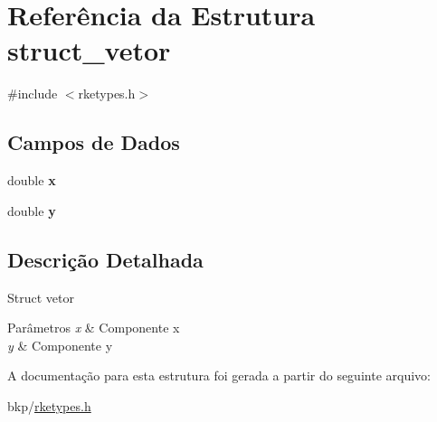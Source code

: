 \hypertarget{structstruct__vetor}{
\section{Referência da Estrutura struct\_\-vetor}
\label{structstruct__vetor}
}


{\ttfamily \#include $<$rketypes.h$>$}

\subsection*{Campos de Dados}
\begin{DoxyCompactItemize}
\item 
\hypertarget{structstruct__vetor_af88b946fb90d5f08b5fb740c70e98c10}{
double {\bfseries x}}
\label{structstruct__vetor_af88b946fb90d5f08b5fb740c70e98c10}

\item 
\hypertarget{structstruct__vetor_ab927965981178aa1fba979a37168db2a}{
double {\bfseries y}}
\label{structstruct__vetor_ab927965981178aa1fba979a37168db2a}

\end{DoxyCompactItemize}


\subsection{Descrição Detalhada}
Struct vetor 
\begin{DoxyParams}{Parâmetros}
{\em x} & Componente x \\
\hline
{\em y} & Componente y \\
\hline
\end{DoxyParams}


A documentação para esta estrutura foi gerada a partir do seguinte arquivo:\begin{DoxyCompactItemize}
\item 
bkp/\hyperlink{rketypes_8h}{rketypes.h}\end{DoxyCompactItemize}
